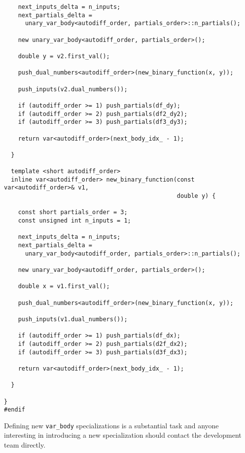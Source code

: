 \begin{verbatim}
    next_inputs_delta = n_inputs;
    next_partials_delta =
      unary_var_body<autodiff_order, partials_order>::n_partials();
    
    new unary_var_body<autodiff_order, partials_order>();
    
    double y = v2.first_val();
    
    push_dual_numbers<autodiff_order>(new_binary_function(x, y));
    
    push_inputs(v2.dual_numbers());
    
    if (autodiff_order >= 1) push_partials(df_dy);
    if (autodiff_order >= 2) push_partials(df2_dy2);
    if (autodiff_order >= 3) push_partials(df3_dy3);
    
    return var<autodiff_order>(next_body_idx_ - 1);
    
  }
  
  template <short autodiff_order>
  inline var<autodiff_order> new_binary_function(const var<autodiff_order>& v1,
                                                 double y) {
    
    const short partials_order = 3;
    const unsigned int n_inputs = 1;
    
    next_inputs_delta = n_inputs;
    next_partials_delta =
      unary_var_body<autodiff_order, partials_order>::n_partials();
    
    new unary_var_body<autodiff_order, partials_order>();
    
    double x = v1.first_val();
    
    push_dual_numbers<autodiff_order>(new_binary_function(x, y));
    
    push_inputs(v1.dual_numbers());
    
    if (autodiff_order >= 1) push_partials(df_dx);
    if (autodiff_order >= 2) push_partials(d2f_dx2);
    if (autodiff_order >= 3) push_partials(d3f_dx3);
    
    return var<autodiff_order>(next_body_idx_ - 1);
    
  }

}
#endif
\end{verbatim}

Defining new \verb|var_body| specializations is a substantial task and anyone
interesting in introducing a new specialization should contact the development
team directly.